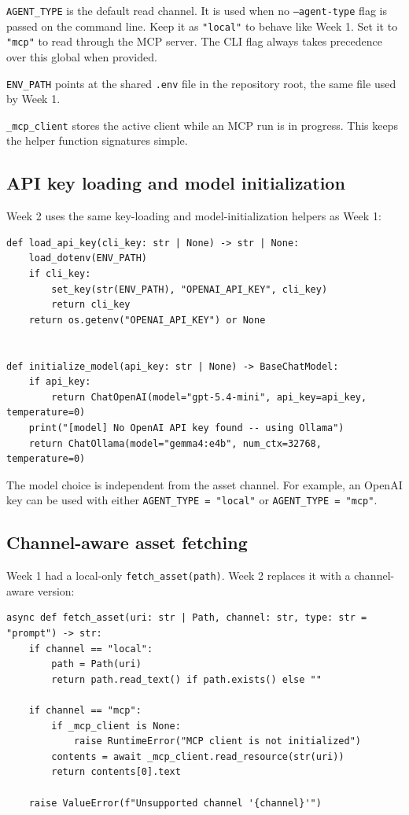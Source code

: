 \documentclass[12pt, a4paper]{article}
\begin{document}
\texttt{AGENT\_TYPE} is the default read channel. It is used when no \texttt{--agent-type} flag is passed on the command line. Keep it as \texttt{"local"} to behave like Week 1. Set it to \texttt{"mcp"} to read through the MCP server. The CLI flag always takes precedence over this global when provided.

\texttt{ENV\_PATH} points at the shared \texttt{.env} file in the repository root, the same file used by Week 1.

\texttt{\_mcp\_client} stores the active client while an MCP run is in progress. This keeps the helper function signatures simple.

\subsection{API key loading and model initialization}

Week 2 uses the same key-loading and model-initialization helpers as Week 1:

\begin{lstlisting}[style=pythonstyle]
def load_api_key(cli_key: str | None) -> str | None:
    load_dotenv(ENV_PATH)
    if cli_key:
        set_key(str(ENV_PATH), "OPENAI_API_KEY", cli_key)
        return cli_key
    return os.getenv("OPENAI_API_KEY") or None


def initialize_model(api_key: str | None) -> BaseChatModel:
    if api_key:
        return ChatOpenAI(model="gpt-5.4-mini", api_key=api_key, temperature=0)
    print("[model] No OpenAI API key found -- using Ollama")
    return ChatOllama(model="gemma4:e4b", num_ctx=32768, temperature=0)
\end{lstlisting}

The model choice is independent from the asset channel. For example, an OpenAI key can be used with either \texttt{AGENT\_TYPE = "local"} or \texttt{AGENT\_TYPE = "mcp"}.

\subsection{Channel-aware asset fetching}

Week 1 had a local-only \texttt{fetch\_asset(path)}. Week 2 replaces it with a channel-aware version:

\begin{lstlisting}[style=pythonstyle]
async def fetch_asset(uri: str | Path, channel: str, type: str = "prompt") -> str:
    if channel == "local":
        path = Path(uri)
        return path.read_text() if path.exists() else ""

    if channel == "mcp":
        if _mcp_client is None:
            raise RuntimeError("MCP client is not initialized")
        contents = await _mcp_client.read_resource(str(uri))
        return contents[0].text

    raise ValueError(f"Unsupported channel '{channel}'")
\end{lstlisting}
\end{document}
